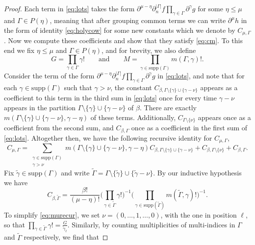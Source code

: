 \documentclass[oneside,hidelinks,indentfirst,10pt]{book}
\begin{document}
\begin{proof}
Each term in \eqref{eq:lots} takes the form \(\partial^{\mu-\eta}\partial^{|\Gamma|}_nf\prod_{\gamma\in\Gamma}\partial^\gamma g\) for some \(\eta\leq \mu\) and \(\Gamma\in P(\eta)\), meaning that after grouping common terms we can write \(\partial^\mu h\) in the form of identity \eqref{eq:holycow} for some new constants which we denote by \(C_{\mu,\Gamma}\). Now we compute these coefficients and show that they satisfy \eqref{eq:cm}. To this end we fix \(\eta\leq\mu\) and \(\Gamma\in P(\eta)\), and for brevity, we also define 
\[
    G=\prod_{\gamma\in\Gamma}\gamma!\qquad\textrm{and}\qquad M=\prod_{\gamma\in\mathrm{supp}(\Gamma)}m(\Gamma,\gamma)!.
\]
Consider the term of the form \(\partial^{\mu-\eta}\partial^{|\Gamma|}_nf\prod_{\gamma\in\Gamma}\partial^\gamma g\) in \eqref{eq:lots}, and note that for each \(\gamma\in\mathrm{supp}(\Gamma)\) such that \(\gamma>\nu\), the constant \(C_{\beta,\Gamma\setminus\{\gamma\}\cup\{\gamma-\nu\}}\) appears as a coefficient to this term in the third sum in \eqref{eq:lots} once for every time \(\gamma-\nu\) appears in the partition \(\Gamma\setminus\{\gamma\}\cup\{\gamma-\nu\}\) of \(\beta\). There are exactly \(m(\Gamma\setminus\{\gamma\}\cup\{\gamma-\nu\},\gamma-\eta)\) of these terms. Additionally, \(C_{\Gamma\setminus\{\nu\}}\) appears once as a coefficient from the second sum, and \(C_{\beta,\Gamma}\) once as a coefficient in the first sum of \eqref{eq:lots}. Altogether then, we have the following recursive identity for \(C_{\mu,\Gamma}\),
\begin{equation}\label{eq:murecur}
    C_{\mu,\Gamma}=\sum_{\substack{\gamma\in\mathrm{supp}(\Gamma)\\\gamma>\nu}}m(\Gamma\setminus\{\gamma\}\cup\{\gamma-\nu\},\gamma-\eta)C_{\beta,\Gamma\setminus\{\gamma\}\cup\{\gamma-\nu\}}+C_{\beta,\Gamma\setminus\{\nu\}}+C_{\beta,\Gamma}.
\end{equation}
Fix \(\tilde{\gamma}\in\mathrm{supp}(\Gamma)\) and write \(\tilde{\Gamma}=\Gamma\setminus\{\tilde{\gamma}\}\cup\{\tilde{\gamma}-\nu\}\). By our inductive hypothesis we have
\[
    C_{\beta,\tilde{\Gamma}}=\frac{\beta!}{(\mu-\eta)!}\bigg(\prod_{\gamma\in\tilde{\Gamma}}\gamma!\bigg)^{-1}\bigg(\prod_{\gamma\in\mathrm{supp}(\tilde{\Gamma})}m(\tilde{\Gamma},\gamma)!\bigg)^{-1}.
\]
To simplify \eqref{eq:murecur}, we set \(\nu=(0,\dots,1,\dots,0)\), with the one in position \(\ell\), so that \(\prod_{\gamma\in\tilde{\Gamma}}\gamma!= \frac{G}{\tilde{\gamma}_\ell}\). Similarly, by counting multiplicities of multi-indices in \(\Gamma\) and \(\tilde{\Gamma}\) respectively, we find that

\end{proof}
\end{document}
